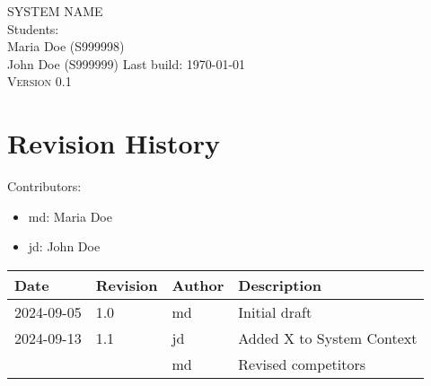 \documentclass[11pt,a4paper,oneside]{report}
\begin{document}

\hypersetup{pageanchor=false}

\begin{titlepage}
\vspace*{1in}
\begin{center}
{\Huge \scshape {\color{red}SYSTEM NAME}}
\\[1in]
Students:\\
Maria Doe (S999998)\\
John Doe (S999999)
\vfill
{\small Last build: \today}
\\[0.5in]
{\scshape Version 0.1}
\\[0.5in]

\vspace*{1in}

\end{center}

\restoregeometry
\end{titlepage}

\cleardoublepage

% 

\section*{Revision History}

Contributors:
\begin{itemize}
    \item md: Maria Doe
    \item jd: John Doe
\end{itemize}

\begin{table}[ht]
\centering
\begin{tabular}{lllp{8cm}}
\toprule
\textbf{Date} & \textbf{Revision} & \textbf{Author} & \textbf{Description} \\
\midrule
2024-09-05 & 1.0 & md & Initial draft\\
2024-09-13 & 1.1 & jd & Added X to System Context\\
           &     & md & Revised competitors\\
\bottomrule
\end{tabular}
\end{table}

\cleardoublepage

\hypersetup{pageanchor=true}

\tableofcontents
\newpage
\end{document}
